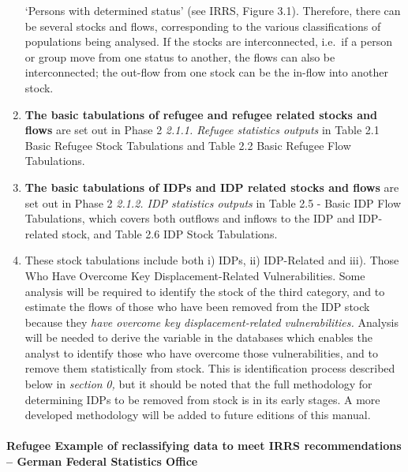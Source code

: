 \documentclass[
]{article}
\begin{document}
\begin{enumerate}
  `Persons with determined status' (see IRRS, Figure 3.1). Therefore,
  there can be several stocks and flows, corresponding to the various
  classifications of populations being analysed. If the stocks are
  interconnected, i.e.~if a person or group move from one status to
  another, the flows can also be interconnected; the out-flow from one
  stock can be the in-flow into another stock.
\item
  \textbf{The basic tabulations of refugee and refugee related stocks and
  flows} are set out in Phase 2 \emph{2.1.1. Refugee statistics outputs}
  in Table 2.1 Basic Refugee Stock Tabulations and Table 2.2 Basic
  Refugee Flow Tabulations.
\item
  \textbf{The basic tabulations of IDPs and IDP related stocks and flows}
  are set out in Phase 2 \emph{2.1.2. IDP statistics outputs} in Table
  2.5 - Basic IDP Flow Tabulations, which covers both outflows and
  inflows to the IDP and IDP-related stock, and Table 2.6 IDP Stock
  Tabulations.
\item
  These stock tabulations include both i) IDPs, ii) IDP-Related and
  iii). Those Who Have Overcome Key Displacement-Related
  Vulnerabilities. Some analysis will be required to identify the
  stock of the third category, and to estimate the flows of those who
  have been removed from the IDP stock because they \emph{have overcome key
  displacement-related vulnerabilities.} Analysis will be needed to
  derive the variable in the databases which enables the analyst to
  identify those who have overcome those vulnerabilities, and to
  remove them statistically from stock. This is identification process
  described below in \emph{section} \emph{0,} but it should be noted that the
  full methodology for determining IDPs to be removed from stock is in
  its early stages. A more developed methodology will be added to
  future editions of this manual.
\end{enumerate}

\hypertarget{refugee-example-of-reclassifying-data-to-meet-irrs-recommendations-german-federal-statistics-office}{%
\paragraph{Refugee Example of reclassifying data to meet IRRS recommendations -- German Federal Statistics Office}\label{refugee-example-of-reclassifying-data-to-meet-irrs-recommendations-german-federal-statistics-office}}
\end{document}
